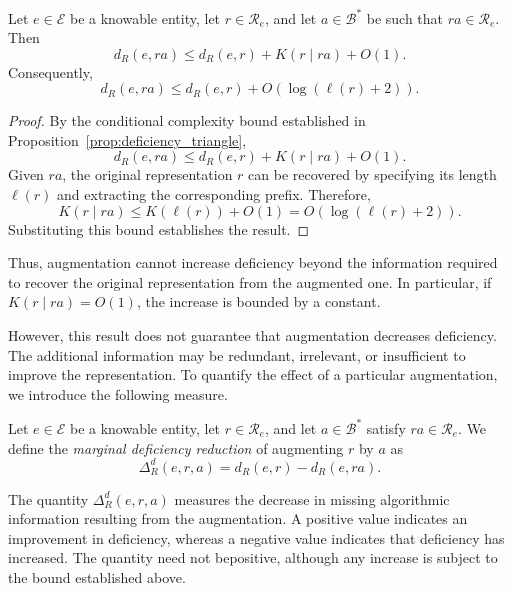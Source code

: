 \begin{proposition}
\label{prop:decrease_deficiency_augmentation}
Let $e\in\mathcal E$ be a knowable entity, let $r\in\mathcal R_e$, and let $a\in\mathcal B^\ast$ be such that $ra\in\mathcal R_e$. Then
\[
d_R(e,ra) \le d_R(e,r) + K(r\mid ra) + O(1).
\]
Consequently,
\[
d_R(e,ra) \le d_R(e,r) + O(\log(\ell(r)+2)).
\]
\end{proposition}
\begin{proof}
By the conditional complexity bound established in Proposition~\ref{prop:deficiency_triangle},
\[
d_R(e,ra) \le d_R(e,r) + K(r\mid ra) + O(1).
\]
Given $ra$, the original representation $r$ can be recovered by specifying its length $\ell(r)$ and extracting the corresponding prefix. Therefore,
\[
K(r\mid ra) \le K(\ell(r))+O(1) = O(\log(\ell(r)+2)).
\]
Substituting this bound establishes the result.
\end{proof}

Thus, augmentation cannot increase deficiency beyond the information required to recover the original representation from the augmented one. In particular, if $K(r\mid ra)=O(1)$, the increase is bounded by a constant.

However, this result does not guarantee that augmentation decreases deficiency. The additional information may be redundant, irrelevant, or insufficient to improve the representation. To quantify the effect of a particular augmentation, we introduce the following measure.

\begin{definition}
\label{def:marginal_deficiency_reduction}
Let $e\in\mathcal E$ be a knowable entity, let $r\in\mathcal R_e$, and let $a\in\mathcal B^\ast$ satisfy $ra\in\mathcal R_e$. We define the \emph{marginal deficiency reduction} of augmenting $r$ by $a$ as
\[
\Delta_R^d(e,r,a) = d_R(e,r) - d_R(e,ra).
\]
\end{definition}

The quantity $\Delta_R^d(e,r,a)$ measures the decrease in missing algorithmic information resulting from the augmentation. A positive value indicates an improvement in deficiency, whereas a negative value indicates that deficiency has increased. The quantity need not bepositive, although any increase is subject to the bound
established above.

